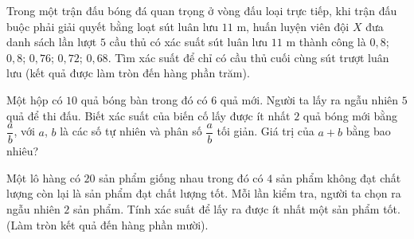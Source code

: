\begin{ex}%
	Trong một trận đấu bóng đá quan trọng ở vòng đấu loại trực tiếp, khi trận đấu buộc phải giải quyết bằng loạt sút luân lưu $11$ m, huấn luyện viên đội $X$ đưa danh sách lần lượt $5$ cầu thủ có xác suất sút luân lưu $11$ m thành công là $0{,}8$; $0{,}8$; $0{,}76$; $0{,}72$; $0{,}68$. Tìm xác suất để chỉ có cầu thủ cuối cùng sút trượt luân lưu (kết quả được làm tròn đến hàng phần  trăm).
\end{ex}

\begin{ex}%
	Một hộp có $10$ quả bóng bàn trong đó có $6$  quả mới. Người ta lấy ra ngẫu nhiên $5$ quả để thi đấu. Biết xác suất của biến cố lấy được ít nhất $2$ quả bóng mới bằng $\dfrac{a}{b}$, với $a$, $b$ là các số tự nhiên và phân số $\dfrac{a}{b}$ tối giản. Giá trị của $a + b$ bằng bao nhiêu?
\end{ex}

\begin{ex}%
	Một lô hàng có $20$ sản phẩm giống nhau trong đó có $4$ sản phẩm không đạt chất lượng còn lại là sản phẩm đạt chất lượng tốt. Mỗi lần kiểm tra, người ta chọn ra ngẫu nhiên $2$ sản phẩm. Tính xác suất để lấy ra được ít nhất một sản phẩm  tốt. (Làm tròn kết quả đến hàng phần mười).
\end{ex}

